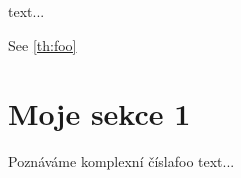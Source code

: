 \documentclass{article}
\begin{document}
\begin{mytheo*}{}
  text...
\end{mytheo*}

See \ref{th:foo} 
\section{Moje sekce 1}
\begin{mytheo}{Poznáváme komplexní čísla}{foo}
  text...
\end{mytheo}
\end{document}
